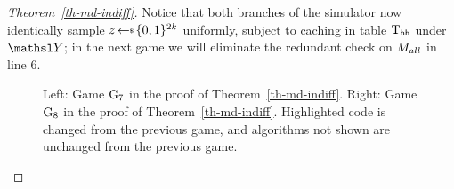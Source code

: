 \begin{proof}[Theorem~\ref{th-md-indiff}]
Notice that both branches of the simulator now identically sample $z \getsr \bits^{2k}$ uniformly, subject to 
caching in table $\text{T}_{\mathsf{hh}}$ under $\YEDSA$; in the next game we will eliminate the redundant check on ${M}_{all}$ in line $6$.

\begin{figure}
\vspace{5pt}
\caption{Left: Game $\textnormal{G}_7$ in the proof of Theorem~\ref{th-md-indiff}. Right: Game $\textnormal{G}_8$ in the proof of Theorem~\ref{th-md-indiff}. Highlighted code is changed from the previous game, and algorithms not shown are unchanged from the previous game.}
\label{fig-chop-gm7}
\label{fig-chop-gm8}
\end{figure}


\end{proof}
